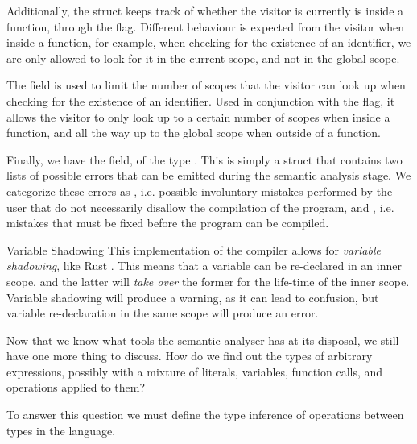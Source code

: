 Additionally, the  struct keeps track of whether the
visitor is currently is inside a function, through the 
flag. Different behaviour is expected from the visitor when inside a function,
for example, when checking for the existence of an identifier, we are only
allowed to look for it in the current scope, and not in the global scope.

The  field is used to limit the number of scopes that
the visitor can look up when checking for the existence of an identifier. Used
in conjunction with the  flag, it allows the visitor to
only look up to a certain number of scopes when inside a function, and all the
way up to the global scope when outside of a function.

Finally, we have the  field, of the type .
This is simply a struct that contains two lists of possible errors that can be
emitted during the semantic analysis stage. We categorize these errors as
, i.e. possible involuntary mistakes performed by the user that
do not necessarily disallow the compilation of the program, and ,
i.e. mistakes that must be fixed before the program can be compiled.

\begin{warningbox}{Variable Shadowing}
    This implementation of the  compiler allows for \textit{variable
        shadowing}, like Rust \cite{rustlangScopeShadowing}.  This means that a variable
    can be re-declared in an inner scope, and the latter will \textit{take over}
    the former for the life-time of the inner scope. Variable shadowing will
    produce a warning, as it can lead to confusion, but variable re-declaration
    in the same scope will produce an error.
\end{warningbox}

Now that we know what tools the semantic analyser has at its disposal, we still
have one more thing to discuss. How do we find out the types of arbitrary
expressions, possibly with a mixture of literals, variables, function calls, and
operations applied to them?

To answer this question we must define the type inference of operations between
types in the language.

